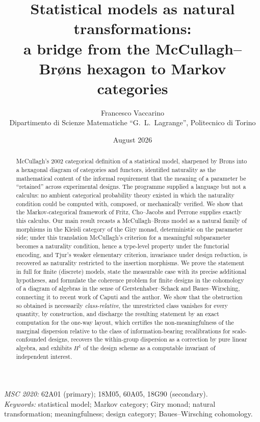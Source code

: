 \documentclass[11pt,a4paper]{article}
\title{Statistical models as natural transformations:\\
a bridge from the McCullagh--Br\o ns hexagon to Markov categories}
\author{Francesco Vaccarino\\
\small Dipartimento di Scienze Matematiche ``G.\ L.\ Lagrange'', Politecnico di Torino}
\date{August 2026}
\theoremstyle{plain}
\theoremstyle{definition}
\theoremstyle{remark}
\begin{document}
\maketitle

\begin{abstract}
\noindent
McCullagh's 2002 categorical definition of a statistical model, sharpened by
Br\o ns into a hexagonal diagram of categories and functors, identified
naturality as the mathematical content of the informal requirement that the
meaning of a parameter be ``retained'' across experimental designs. 
The programme
supplied a language but not a calculus: no ambient categorical probability
theory existed in which the naturality condition could be computed with,
composed, or mechanically verified. We show that the Markov-categorical
framework of Fritz, Cho--Jacobs and Perrone supplies exactly this calculus. Our
main result recasts a McCullagh--Br\o ns model as a natural family of morphisms
in the Kleisli category of the Giry monad, deterministic on the parameter side;
under this translation McCullagh's criterion for a meaningful subparameter
becomes a naturality condition, hence a type-level property under the functorial
encoding, and Tjur's weaker elementary criterion, invariance under design
reduction, is recovered as naturality restricted to the insertion morphisms.
We prove the statement in full for finite (discrete) models, state the
measurable case with its precise additional hypotheses, and formulate the
coherence problem for finite designs in the cohomology of a diagram of algebras
in the sense of Gerstenhaber--Schack and Baues--Wirsching, connecting it to
recent work of Caputi and the author. We show that the obstruction so obtained
is necessarily \emph{class-relative}, the unrestricted class vanishes for
every quantity, by construction, and discharge the resulting statement by an
exact computation for the one-way layout, which certifies the non-meaningfulness of
the marginal dispersion relative to the class of information-bearing
recalibrations for scale-confounded designs, recovers the within-group
dispersion as a correction by pure linear algebra, and
exhibits $H^{1}$ of the design scheme as a computable invariant of independent
interest.
\end{abstract}

\medskip
\noindent\emph{MSC 2020:} 62A01 (primary); 18M05, 60A05, 18G90 (secondary).\\
\emph{Keywords:} statistical model; Markov category; Giry monad; natural
transformation; meaningfulness; design category; Baues--Wirsching cohomology.
\end{document}
